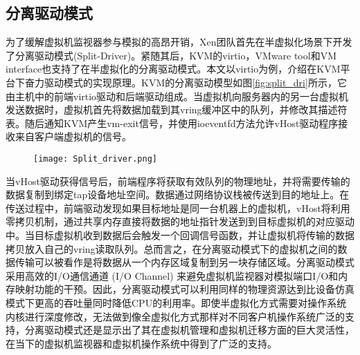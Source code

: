 \subsection{分离驱动模式}
为了缓解虚拟机监视器参与模拟的高昂开销，Xen团队首先在半虚拟化场景下开发了分离驱动模式(Split-Driver)\cite{barham2003xen}。紧随其后，KVM的virtio\cite{russell2008virtio,kivity2007kvm}，VMware tool和VM interface\cite{amsden2006vmi}也支持了在半虚拟化的分离驱动模式。本文以virtio为例，介绍在KVM平台下奋力驱动模式的实现原理。KVM的分离驱动模型如图\ref{fig:split_dri}所示，它由主机中的前端virtio驱动和后端驱动组成。当虚拟机向服务器内的另一台虚拟机发送数据时，虚拟机首先将数据加载到其vring缓冲区中的队列，并修改其描述符表。随后通知KVM产生vm-exit信号，并使用ioeventfd方法允许vHost驱动程序接收来自客户端虚拟机的信号。
\begin{figure}[!htp]
	\centering
	\texttt{[image: Split\_driver.png]}
\end{figure}
当vHost驱动获得信号后，前端程序将获取有效队列的物理地址，并将需要传输的数据复制到绑定tap设备地址空间。数据通过网络协议栈被传送到目的地址上。在传送过程中，前端驱动发现如果目标地址是同一台机器上的虚拟机，vHost将利用零拷贝机制，通过共享内存直接将数据的地址指针发送到到目标虚拟机的对应驱动中。当目标虚拟机收到数据后会触发一个回调信号函数，并让虚拟机将传输的数据拷贝放入自己的vring读取队列。总而言之，在分离驱动模式下的虚拟机之间的数据传输可以被看作是将数据从一个内存区域复制到另一块存储区域。分离驱动模式采用高效的I/O通信通道 (I/O Channel) 来避免虚拟机监视器对模拟端口I/O和内存映射功能的干预。因此，分离驱动模式可以利用同样的物理资源达到比设备仿真模式下更高的吞吐量同时降低CPU的利用率。即使半虚拟化方式需要对操作系统内核进行深度修改，无法做到像全虚拟化方式那样对不同客户机操作系统广泛的支持，分离驱动模式还是显示出了其在虚拟机管理和虚拟机迁移方面的巨大灵活性，在当下的虚拟机监视器和虚拟机操作系统中得到了广泛的支持。


